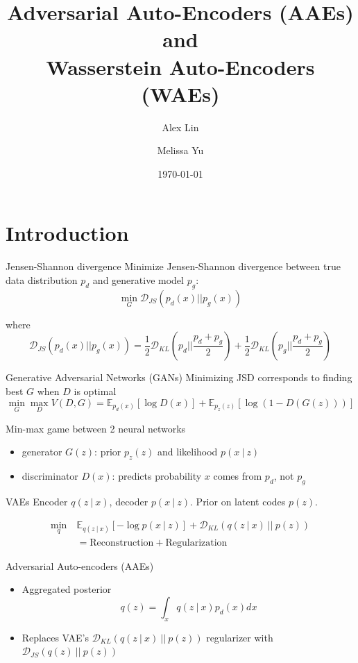 \documentclass{beamer}
\title[AAEs \& WAEs]{Adversarial Auto-Encoders (AAEs) and \\ Wasserstein Auto-Encoders (WAEs)}
\author[A. Lin \and M. Yu]{Alex Lin \and Melissa Yu}
\institute[Harvard University]{Harvard University}
\date{\today}
\newcommand{\E}{\mathbb{E}}
\newcommand\given[1][]{\:#1\vert\:}
\begin{document}
\begin{frame}
\titlepage 
\end{frame}

\section{Introduction} 

\begin{frame}{Jensen-Shannon divergence}
	Minimize Jensen-Shannon divergence between true data distribution $p_d$ and generative model $p_g$:
	\[
	\min_G \mathcal{D}_{JS}(p_d(x) \vert\vert p_g(x))
	\]
	
	where
	\[
	\mathcal{D}_{JS}(p_d(x) \vert\vert p_g(x)) = 
	\frac{1}{2} \mathcal{D}_{KL}(p_d \vert\vert \frac{p_d + p_g}{2}) +
	\frac{1}{2} \mathcal{D}_{KL}(p_g \vert\vert \frac{p_d + p_g}{2})
	\]
\end{frame}

\begin{frame}{Generative Adversarial Networks (GANs)}
	Minimizing JSD corresponds to finding best $G$ when $D$ is optimal
	\[
	\min_G \max_D V(D, G) = \E_{p_d(x)} [\log D(x)] + \E_{p_z(z)} [\log (1 - D(G(z)))]
	\]
	
	Min-max game between 2 neural networks
	\begin{itemize}
		\item generator $G(z)$: prior $p_z(z)$ and likelihood $p(x\given z)$
		\item discriminator $D(x)$: predicts probability $x$ comes from $p_d$, not $p_g$
	\end{itemize}
\end{frame}

\begin{frame}{VAEs}
	Encoder $q(z\given x)$, decoder $p(x\given z)$. Prior on latent codes $p(z)$.
	
	\begin{align*}
	\min_q \ & \E_{q(z\given x)} [-\log p(x\given z)] + \mathcal{D}_{KL}(q(z\given x) \ \vert\vert \ p(z)) \\
	&= \text{Reconstruction} + \text{Regularization}
	\end{align*}
\end{frame}

\begin{frame}{Adversarial Auto-encoders (AAEs)}
	\begin{itemize}
	\item Aggregated posterior
\begin{equation*}
q(z) = \int_{x} q(z\given x) p_d(x) dx
\end{equation*}

	\item Replaces VAE's $\mathcal{D}_{KL}(q(z\given x) \ \vert\vert \ p(z))$ regularizer with $\mathcal{D}_{JS}(q(z) \ \vert\vert \ p(z))$
	\end{itemize}
\end{frame}
\end{document}
